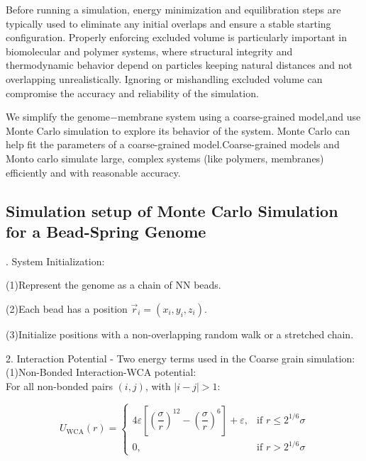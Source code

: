 \documentclass[12pt]{article}
\begin{document}
\begin{flushleft}
Before running a simulation, energy minimization and equilibration steps are typically used to eliminate any initial overlaps and ensure a stable starting configuration. Properly enforcing excluded volume is particularly important in biomolecular and polymer systems, where structural integrity and thermodynamic behavior depend on particles keeping natural distances and not overlapping unrealistically. Ignoring or mishandling excluded volume can compromise the accuracy and reliability of the simulation.



We simplify the genome$-$membrane system using a coarse-grained model,and use Monte Carlo simulation to explore its behavior of the system. Monte Carlo can help fit the parameters of a coarse-grained model.Coarse-grained models and Monto carlo simulate large, complex systems (like polymers, membranes) efficiently and with reasonable accuracy.




\subsection*{Simulation setup of Monte Carlo Simulation for a Bead-Spring Genome}
. System Initialization:

\setlength{\parindent}{6em} (1)Represent the genome as a chain of NN beads.

(2)Each bead has a position $\vec{r}_i = (x_i, y_i, z_i)$.

(3)Initialize positions with a non-overlapping random walk or a stretched chain.\\

\setlength{\parindent}{0pt}




2. Interaction Potential - Two energy terms used in the Coarse grain simulation:\\

\setlength{\parindent}{6em}(1)Non-Bonded Interaction-WCA potential:\\
\setlength{\parindent}{0pt}
\setlength{\parindent}{7em}For all non-bonded pairs $(i, j)$, with $|i - j| > 1$:
\setlength{\parindent}{0pt}

\begin{equation}
U_{\text{WCA}}(r) = 
\begin{cases}
4\varepsilon \left[ \left( \dfrac{\sigma}{r} \right)^{12} - \left( \dfrac{\sigma}{r} \right)^6 \right] + \varepsilon, & \text{if } r \leq 2^{1/6} \sigma \\
0, & \text{if } r > 2^{1/6} \sigma
\end{cases}
\end{equation}



\end{flushleft}
\end{document}
